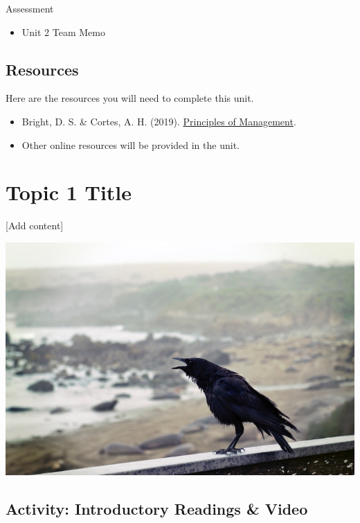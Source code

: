 \documentclass[
]{book}
\providecommand{\tightlist}{%
  \setlength{\itemsep}{0pt}\setlength{\parskip}{0pt}}
\begin{document}
\begin{assessment}
{Assessment}

\begin{itemize}
\tightlist
\item
  Unit 2 Team Memo
\end{itemize}
\end{assessment}

\hypertarget{resources-3}{%
\subsection*{Resources}\label{resources-3}}

Here are the resources you will need to complete this unit.

\begin{itemize}
\tightlist
\item
  Bright, D. S. \& Cortes, A. H. (2019). \href{https://openstax.org/details/books/principles-management}{Principles of Management}.\\
\item
  Other online resources will be provided in the unit.
\end{itemize}

\hypertarget{topic-1-title}{%
\section{Topic 1 Title}\label{topic-1-title}}

{[}Add content{]}

\includegraphics{assets/sample/crow.jpg}

\hypertarget{activity-introductory-readings-video}{%
\subsection*{Activity: Introductory Readings \& Video}\label{activity-introductory-readings-video}}
\end{document}
